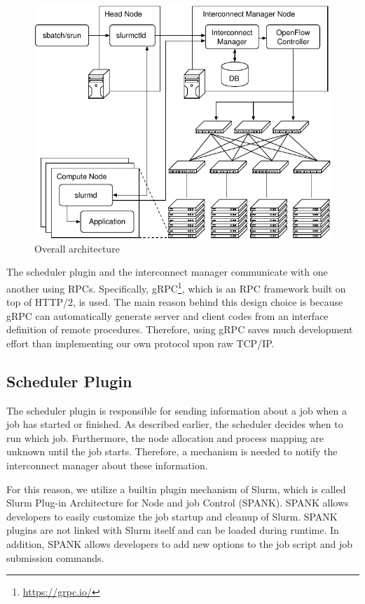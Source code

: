\documentclass[graybox]{svmult}
\begin{document}
\begin{figure}
    \centering
    \includegraphics{architecture}
    \caption{Overall architecture}%
    \label{kt:fig:architecture}
\end{figure}

The scheduler plugin and the interconnect manager communicate with
one another using RPCs. Specifically, gRPC\footnote{\url{https://grpc.io/}}, which is an
RPC framework built on top of HTTP/2, is used. The main reason behind this
design choice is because gRPC can automatically generate server and client
codes from an interface definition of remote procedures. Therefore, using gRPC
saves much development effort than implementing our own protocol upon raw
TCP/IP\@.

\subsection{Scheduler Plugin}

The scheduler plugin is responsible for sending information about a job when a
job has started or finished. As described earlier, the scheduler decides when
to run which job. Furthermore, the node allocation and process mapping are
unknown until the job starts. Therefore, a mechanism is needed to notify the
interconnect manager about these information.

For this reason, we utilize a builtin plugin mechanism of Slurm, which is
called Slurm Plug-in Architecture for Node and job Control (SPANK). SPANK
allows developers to easily customize the job startup and cleanup of Slurm.
SPANK plugins are not linked with Slurm itself and can be loaded during
runtime. In addition, SPANK allows developers to add new options to the job
script and job submission commands.
\end{document}
